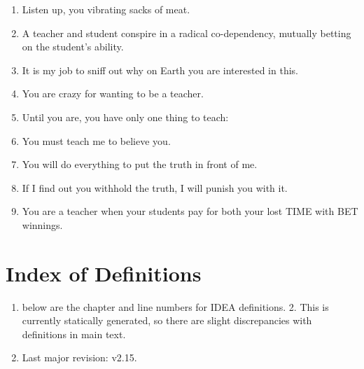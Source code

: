 \documentclass[
]{book}
\providecommand{\tightlist}{%
  \setlength{\itemsep}{0pt}\setlength{\parskip}{0pt}}
\begin{document}
\begin{enumerate}
\def\labelenumi{\arabic{enumi}.}
\setcounter{enumi}{4}
\tightlist
\item
  Listen up, you vibrating sacks of meat.
\item
  A teacher and student conspire in a radical co-dependency, mutually betting on
  the student's ability.
\item
  It is my job to sniff out why on Earth you are interested in this.
\item
  You are crazy for wanting to be a teacher.
\item
  Until you are, you have only one thing to teach:
\item
  You must teach me to believe you.
\item
  You will do everything to put the truth in front of me.
\item
  If I find out you withhold the truth, I will punish you with it.
\item
  You are a teacher when your students pay for both your lost TIME with BET winnings.
\end{enumerate}

\hypertarget{index-of-definitions}{%
\chapter{Index of Definitions}\label{index-of-definitions}}

\begin{enumerate}
\def\labelenumi{\arabic{enumi}.}
\tightlist
\item
  below are the chapter and line numbers for IDEA definitions. 2. This is currently statically generated, so there are slight discrepancies with definitions in main text.
\item
  Last major revision: v2.15.
\end{enumerate}
\end{document}
